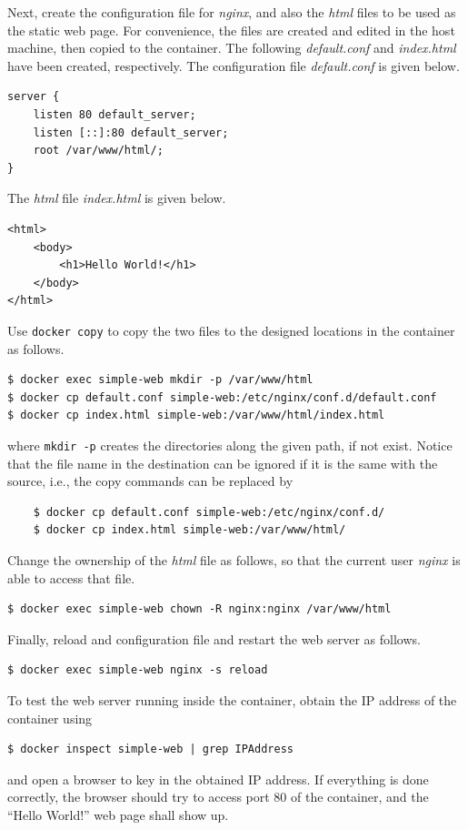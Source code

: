 Next, create the configuration file for \textit{nginx}, and also the \textit{html} files to be used as the static web page. For convenience, the files are created and edited in the host machine, then copied to the container. The following \textit{default.conf} and \textit{index.html} have been created, respectively. The configuration file \textit{default.conf} is given below.
\begin{lstlisting}
server {
	listen 80 default_server;
	listen [::]:80 default_server;
	root /var/www/html/;
}
\end{lstlisting}
The \textit{html} file \textit{index.html} is given below.
\begin{lstlisting}
<html>
	<body>
		<h1>Hello World!</h1>
	</body>
</html>
\end{lstlisting}
Use \verb|docker copy| to copy the two files to the designed locations in the container as follows.
\begin{lstlisting}
$ docker exec simple-web mkdir -p /var/www/html
$ docker cp default.conf simple-web:/etc/nginx/conf.d/default.conf
$ docker cp index.html simple-web:/var/www/html/index.html
\end{lstlisting}
where \verb|mkdir -p| creates the directories along the given path, if not exist. Notice that the file name in the destination can be ignored if it is the same with the source, i.e., the copy commands can be replaced by
\begin{lstlisting}
	$ docker cp default.conf simple-web:/etc/nginx/conf.d/
	$ docker cp index.html simple-web:/var/www/html/
\end{lstlisting}

Change the ownership of the \textit{html} file as follows, so that the current user \textit{nginx} is able to access that file.
\begin{lstlisting}
$ docker exec simple-web chown -R nginx:nginx /var/www/html
\end{lstlisting}

Finally, reload and configuration file and restart the web server as follows.
\begin{lstlisting}
$ docker exec simple-web nginx -s reload
\end{lstlisting}

To test the web server running inside the container, obtain the IP address of the container using
\begin{lstlisting}
$ docker inspect simple-web | grep IPAddress
\end{lstlisting}
and open a browser to key in the obtained IP address. If everything is done correctly, the browser should try to access port 80 of the container, and the ``Hello World!'' web page shall show up.

